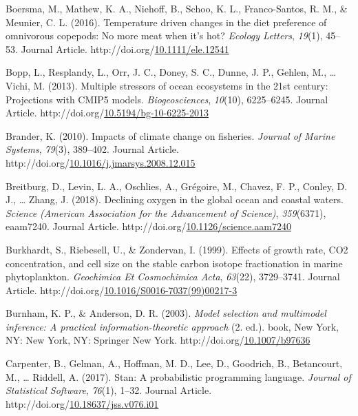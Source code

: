 \documentclass [11pt, proquest] {uwthesis}[2015/03/03]
\newlength{\cslhangindent}
\newenvironment{CSLReferences}%
{\setlength{\parindent}{0pt}%
\everypar{\setlength{\hangindent}{\cslhangindent}}\ignorespaces}%
{\par}
\begin{document}
\begin{CSLReferences}{1}{0}
\leavevmode\hypertarget{ref-Boersma2015}{}%
Boersma, M., Mathew, K. A., Niehoff, B., Schoo, K. L., Franco-Santos, R. M., \& Meunier, C. L. (2016). Temperature driven changes in the diet preference of omnivorous copepods: No more meat when it's hot? \emph{Ecology Letters}, \emph{19}(1), 45--53. Journal Article. http://doi.org/\href{https://doi.org/10.1111/ele.12541}{10.1111/ele.12541}

\leavevmode\hypertarget{ref-Bopp2013}{}%
Bopp, L., Resplandy, L., Orr, J. C., Doney, S. C., Dunne, J. P., Gehlen, M., \ldots{} Vichi, M. (2013). Multiple stressors of ocean ecosystems in the 21st century: Projections with CMIP5 models. \emph{Biogeosciences}, \emph{10}(10), 6225--6245. Journal Article. http://doi.org/\href{https://doi.org/10.5194/bg-10-6225-2013}{10.5194/bg-10-6225-2013}

\leavevmode\hypertarget{ref-Brander2010}{}%
Brander, K. (2010). Impacts of climate change on fisheries. \emph{Journal of Marine Systems}, \emph{79}(3), 389--402. Journal Article. http://doi.org/\href{https://doi.org/10.1016/j.jmarsys.2008.12.015}{10.1016/j.jmarsys.2008.12.015}

\leavevmode\hypertarget{ref-Brietburg2018}{}%
Breitburg, D., Levin, L. A., Oschlies, A., Grégoire, M., Chavez, F. P., Conley, D. J., \ldots{} Zhang, J. (2018). Declining oxygen in the global ocean and coastal waters. \emph{Science (American Association for the Advancement of Science)}, \emph{359}(6371), eaam7240. Journal Article. http://doi.org/\href{https://doi.org/10.1126/science.aam7240}{10.1126/science.aam7240}

\leavevmode\hypertarget{ref-Burkhardt1999}{}%
Burkhardt, S., Riebesell, U., \& Zondervan, I. (1999). Effects of growth rate, CO2 concentration, and cell size on the stable carbon isotope fractionation in marine phytoplankton. \emph{Geochimica Et Cosmochimica Acta}, \emph{63}(22), 3729--3741. Journal Article. http://doi.org/\href{https://doi.org/10.1016/S0016-7037(99)00217-3}{10.1016/S0016-7037(99)00217-3}

\leavevmode\hypertarget{ref-Burnham2003}{}%
Burnham, K. P., \& Anderson, D. R. (2003). \emph{Model selection and multimodel inference: A practical information-theoretic approach} (2. ed.). book, New York, NY: New York, NY: Springer New York. http://doi.org/\href{https://doi.org/10.1007/b97636}{10.1007/b97636}

\leavevmode\hypertarget{ref-Carpenter2017}{}%
Carpenter, B., Gelman, A., Hoffman, M. D., Lee, D., Goodrich, B., Betancourt, M., \ldots{} Riddell, A. (2017). Stan: A probabilistic programming language. \emph{Journal of Statistical Software}, \emph{76}(1), 1--32. Journal Article. http://doi.org/\href{https://doi.org/10.18637/jss.v076.i01}{10.18637/jss.v076.i01}


\end{CSLReferences}
\end{document}
